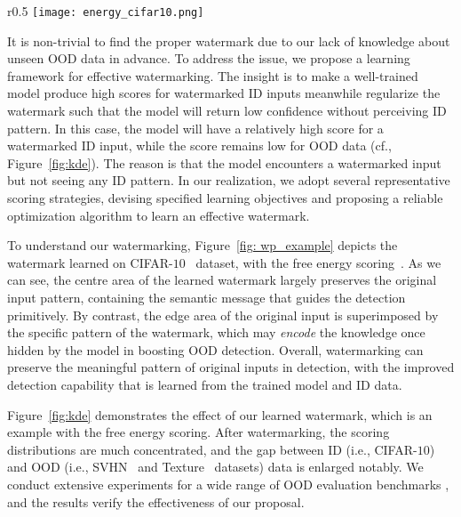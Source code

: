 \documentclass{article}
\begin{document}
\begin{wrapfigure}{r}{0.5\textwidth}
    \centering
    \texttt{[image: energy\_cifar10.png]}
\vspace{1.5pt}
    \caption{Watermarking on CIFAR-$10$~\cite{krizhevsky2009learning} with free energy scoring~\cite{liu2020energy}. The left figure is the learned watermark; the middle figure is an original input; the right figure is the watermarked result.} \label{fig: wp_example}
\end{wrapfigure}

It is non-trivial to find the proper watermark due to our lack of knowledge about unseen OOD data in advance. To address the issue, we propose a learning framework for effective watermarking. The insight is to make a well-trained model produce high scores for watermarked ID inputs meanwhile regularize the watermark such that the model will return low confidence without perceiving ID pattern. In this case, the model will have a relatively high score for a watermarked ID input, while the score remains low for OOD data (cf., Figure~\ref{fig:kde}). The reason is that the model encounters a watermarked input but not seeing any ID pattern. In our realization, we adopt several representative scoring strategies, devising specified learning objectives and proposing a reliable optimization algorithm to learn an effective watermark. 





To understand our watermarking, Figure~\ref{fig: wp_example} depicts the watermark learned on CIFAR-$10$~\cite{krizhevsky2009learning} dataset, with the free energy scoring~\cite{liu2020energy}. As we can see, the centre area of the learned watermark largely preserves the original input pattern, containing the semantic message that guides the detection primitively. By contrast, the edge area of the original input is superimposed by the specific pattern of the watermark, which may \emph{encode} the knowledge once hidden by the model in boosting OOD detection. Overall, watermarking can preserve the meaningful pattern of original inputs in detection, with the improved detection capability that is learned from the trained model and ID data. 



Figure~\ref{fig:kde} demonstrates the effect of our learned watermark, which is an example with the free energy scoring. After watermarking, the scoring distributions are much concentrated, and the gap between ID (i.e., CIFAR-$10$) and OOD (i.e., SVHN~\cite{netzer2011reading} and Texture~\cite{cimpoi2014describing} datasets) data is enlarged notably. We conduct extensive experiments for a wide range of OOD evaluation benchmarks 
, and the results verify the effectiveness of our proposal. 
\end{document}
